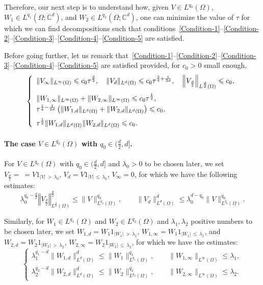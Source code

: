 \documentclass[10pt]{amsart}
\theoremstyle{definition}\newtheorem{defi}[theo]{Definition}\newtheorem{rema}[theo]{Remark}\newtheorem{exam}[theo]{Example}\newtheorem{exem}[theo]{Example}\newtheorem{nota}[theo]{Notation}
\newcommand*\C{\mathbb{C}}
\newcommand*\ds{\displaystyle}
\newcommand{\norm}[1]{\left\Vert#1\right\Vert}
\renewcommand{\leq}{\leqslant}
\begin{document}
Therefore, our next step is to understand how, given $V \in L^{q_0}(\Omega)$, $W_1 \in L^{q_1}(\Omega; \C^d)$, and $W_2 \in L^{q_2}(\Omega; \C^d)$, one can minimize the value of $\tau$ for which we can find decompositions such that conditions~\eqref{Condition-1}--\eqref{Condition-2}--\eqref{Condition-3}--\eqref{Condition-4}--\eqref{Condition-5} are satisfied.

Before going further, let us remark that~\eqref{Condition-1}--\eqref{Condition-2}--\eqref{Condition-3}--\eqref{Condition-4}--\eqref{Condition-5} are satisfied provided, for $c_0 >0$ small enough,
\begin{equation}\label{Conditions-Summary}
\left\{
\begin{array}{l}
\ds \| V_\infty \|_{L^\infty(\Omega)} \leq c_0 \tau^{\frac{3}{2}},
\quad
\| V_d\|_{L^{d}(\Omega)} \leq c_0 \tau^{\frac{3}{4} + \frac{1}{2d}},
\quad
\norm{ V_{\frac{d}{2}}}_{L^{\frac{d}{2}}(\Omega)} \leq c_0,
\medskip
\\
\ds \| W_{1, \infty} \|_{L^\infty(\Omega)}+ \| W_{2, \infty} \|_{L^\infty(\Omega)} \leq c_0 \tau^{\frac{1}{2}},\\[0.20em]
\tau^{\frac{1}{4} - \frac{1}{2d}} \left(\| W_{1,d} \|_{L^d(\Omega)} + \| W_{2, d} \|_{L^d(\Omega)}\right) \leq c_0,
\medskip
\\
\ds
\tau^{\frac{1}{2}} \| W_{1,d} \|_{L^d(\Omega)} \| W_{2, d} \|_{L^d(\Omega)} \leq c_0.
\end{array}\right.
\end{equation}
\paragraph{The case $V \in L^{q_0}(\Omega)$ with $q_0 \in (\frac{d}{2}, d]$.}
For $V \in L^{q_0}(\Omega)$ with $q_0 \in (\frac{d}{2}, d]$ and $\lambda_0>0$ to be chosen later, we set $V_{\frac{d}{2}} = \ = V 1_{|V|\,>\,\lambda_0}$, $ V_d = V 1_{|V|\,\leq\,\lambda_0}$, $V_\infty = 0$, for which we have the following estimates:
\[
\lambda_0^{q_0-\frac{d}{2}} \norm{V_{\frac{d}{2}}}_{L^{\frac{d}{2}}(\Omega)}^{\frac{d}{2}} \leq \| V \|_{L^{q_0}(\Omega)}^{q_0},
\qquad
\| V_{d} \|_{L^d(\Omega)}^d \leq \lambda_0^{d - q_0} \| V \|_{L^{q_0}(\Omega)}^{q_0}.
\]

Similarly, for $W_1 \in L^{q_1}(\Omega)$ and $W_2 \in L^{q_2}(\Omega)$ and $\lambda_1, \lambda_2$ positive numbers to be chosen later, we set $W_{1,d} = W_1 1_{|W_1|\, >\,\lambda_1}$, $W_{1, \infty} = W_1 1_{|W_1|\,\leq\, \lambda_1}$, and $W_{2,d} = W_2 1_{|W_2|\,>\, \lambda_2}$, $W_{2, \infty} = W_2 1_{|W_2|\,\leq\,\lambda_2}$, for which we have the estimates:
\begin{equation}\label{Est-W-1-d-infty}
\left\{
\begin{array}{l}
\ds \lambda_1^{q_1-d} \| W_{1,d}\|_{L^{d}(\Omega)}^{d} \leq \| W_1 \|_{L^{q_1}(\Omega)}^{q_1},
\qquad
\| W_{1,\infty} \|_{L^\infty(\Omega)} \leq \lambda_1,
\\[0.15em]
\lambda_2^{q_2-d} \| W_{2,d}\|_{L^{d}(\Omega)}^{d} \leq \| W_2 \|_{L^{q_2}(\Omega)}^{q_2},
\qquad
\| W_{2,\infty} \|_{L^\infty(\Omega)} \leq \lambda_2.
\end{array}
\right.
\end{equation}
\end{document}
